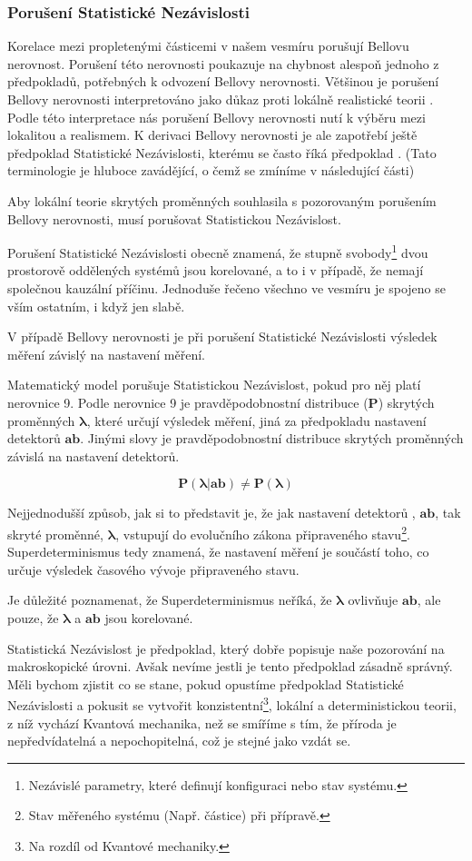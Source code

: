 \clearpage

\subsubsection{Porušení Statistické Nezávislosti}
Korelace mezi propletenými částicemi v našem vesmíru porušují Bellovu nerovnost. Porušení této nerovnosti poukazuje na chybnost alespoň jednoho z předpokladů, potřebných k odvození Bellovy nerovnosti. Většinou je porušení Bellovy nerovnosti interpretováno jako důkaz proti lokálně realistické teorii \parencite{belltest:violation}. Podle této interpretace nás porušení Bellovy nerovnosti nutí k výběru mezi lokalitou a realismem. K derivaci Bellovy nerovnosti je ale zapotřebí ještě předpoklad Statistické Nezávislosti, kterému se často říká předpoklad . (Tato terminologie je hluboce zavádějící, o čemž se zmíníme v následující části) 

Aby lokální teorie skrytých proměnných souhlasila s pozorovaným porušením Bellovy nerovnosti, musí porušovat Statistickou Nezávislost.

Porušení Statistické Nezávislosti obecně znamená, že stupně svobody\footnote[9]{Nezávislé parametry, které definují konfiguraci nebo stav systému.} dvou prostorově oddělených systémů jsou korelované, a to i v případě, že nemají společnou kauzální příčinu. Jednoduše řečeno všechno ve vesmíru je spojeno se vším ostatním, i když jen slabě. 

V případě Bellovy nerovnosti je při porušení Statistické Nezávislosti výsledek měření závislý na nastavení měření. 

Matematický model porušuje Statistickou Nezávislost, pokud pro něj platí nerovnice 9. Podle nerovnice 9 je pravděpodobnostní distribuce ($\bm{P}$) skrytých proměnných $\bm{\lambda}$, které určují výsledek měření, jiná za předpokladu nastavení detektorů $\bm{ab}$. Jinými slovy je pravděpodobnostní distribuce skrytých proměnných závislá na nastavení detektorů.

\begin{equation}
    \bm{P(\lambda|ab) \neq P(\lambda)}
    \label{eq:9}
\end{equation}

Nejjednodušší způsob, jak si to představit je, že jak nastavení detektorů , $\bm{ab}$, tak skryté proměnné, $\bm{\lambda}$, vstupují do evolučního zákona připraveného stavu\footnote[10]{Stav měřeného systému (Např. částice) při přípravě.}. Superdeterminismus tedy znamená, že nastavení měření je součástí toho, co určuje výsledek časového vývoje připraveného stavu.

Je důležité poznamenat, že Superdeterminismus neříká, že $\bm{\lambda}$ ovlivňuje $\bm{ab}$, ale pouze, že $\bm{\lambda}$ a $\bm{ab}$ jsou korelované.

Statistická Nezávislost je předpoklad, který dobře popisuje naše pozorování na makroskopické úrovni. Avšak nevíme jestli je tento předpoklad zásadně správný. Měli bychom zjistit co se stane, pokud opustíme předpoklad Statistické Nezávislosti a pokusit se vytvořit konzistentní\footnote[11]{Na rozdíl od Kvantové mechaniky.}, lokální a deterministickou teorii, z níž vychází Kvantová mechanika, než se smíříme s tím, že příroda je nepředvídatelná a nepochopitelná, což je stejné jako vzdát se.